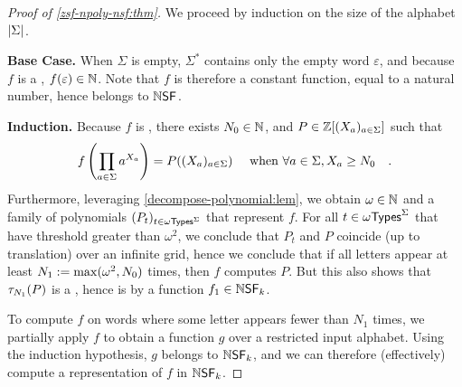 \begin{proof}[Proof of \cref{zsf-npoly-nsf:thm}]
    We proceed by induction on the size of the alphabet $\card{\Sigma}$.

    \textbf{Base Case.} When $\Sigma$ is empty, $\Sigma^*$ contains
    only the empty word $\varepsilon$, and because $f$ is a
    , $f(\varepsilon) \in \mathbb{N}$.
    Note that $f$ is therefore a constant function, equal to a natural
    number, hence belongs to $\NSF$.

    
    \textbf{Induction.}
    Because $f$ is ,
    there exists $N_0 \in \mathbb{N}$, 
    and $P \in \mathbb{Z}[(X_a)_{a \in \Sigma}]$ 
    such that
    \begin{equation*}
        f\left( \prod_{a \in \Sigma} a^{X_a} \right)
        = 
        P((X_a)_{a \in \Sigma})
        \quad
        \text{ when }
        \forall a \in \Sigma, X_a \geq N_0
        \quad .
    \end{equation*}
    Furthermore, leveraging \cref{decompose-polynomial:lem},
    we obtain $\omega \in \mathbb{N}$
    and a family of polynomials 
    $\seqof{P_{t}}{t \in \ModuloTypes[\omega]^\Sigma}$
    that represent $f$.
    For all $t \in \ModuloTypes[\omega]^\Sigma$
    that have threshold greater than $\omega^2$,
    we conclude that $P_t$ and $P$ coincide (up to translation) over an infinite grid,
    hence we conclude that
    if all letters appear at least $N_1 \mathrel{:=} \max (\omega^2, N_0)$ times,
    then $f$ computes $P$. But this also shows that
    $\tau_{N_1}(P)$ is a , hence is
     by a function $f_1 \in \NSF[k]$.
    
    To compute $f$ on words where some letter appears fewer than
    $N_1$ times, we partially apply $f$ to obtain a function $g$
    over a restricted input alphabet. Using the induction hypothesis,
    $g$ belongs to $\NSF[k]$, and we can therefore (effectively) compute
    a representation of $f$ in $\NSF[k]$.
\end{proof}

